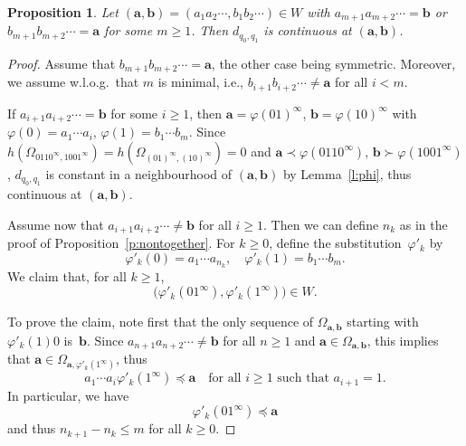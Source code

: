 \documentclass{amsart}
\newtheorem{proposition}[theorem]{Proposition}
\theoremstyle{definition}
\numberwithin{equation}{section}
\newcommand{\ba}{\mathbf{a}}
\newcommand{\bb}{\mathbf{b}}
\begin{document}
\begin{proposition} \label{p:together}
Let $(\ba,\bb) = (a_1a_2\cdots, b_1b_2\cdots) \in W$ with $a_{m+1} a_{m+2} \cdots = \bb$ or $b_{m+1} b_{m+2} \cdots = \ba$ for some $m \ge 1$.
Then $d_{q_0,q_1}$ is continuous at $(\ba,\bb)$. 
\end{proposition}

\begin{proof}
Assume that $b_{m+1} b_{m+2} \cdots = \ba$, the other case being symmetric.
Moreover, we assume w.l.o.g.\ that $m$ is minimal, i.e., $b_{i+1} b_{i+2} \cdots \ne \ba$ for all $i < m$.

If $a_{i+1}a_{i+2}\cdots = \bb$ for some $i \ge 1$, then $\ba = \varphi(01)^\infty$, $\bb = \varphi(10)^\infty$ with $\varphi(0) = a_1\cdots a_i$, $\varphi(1) = b_1\cdots b_m$.
Since $h(\Omega_{0110^\infty,1001^\infty}) = h(\Omega_{(01)^\infty,(10)^\infty}) = 0$ and $\ba \prec \varphi(0110^\infty)$, $\bb \succ \varphi(1001^\infty)$, $d_{q_0,q_1}$ is constant in a neighbourhood of $(\ba,\bb)$ by Lemma~\ref{l:phi}, thus continuous at $(\ba,\bb)$. 

Assume now that $a_{i+1}a_{i+2}\cdots \ne \bb$ for all $i \ge 1$.
Then we can define $n_k$ as in the proof of Proposition~\ref{p:nontogether}.
For $k \ge 0$, define the substitution~$\varphi'_k$ by
\[
\varphi'_k(0) = a_1 \cdots a_{n_k}, \quad \varphi'_k(1) = b_1 \cdots b_m.
\]
We claim that, for all $k \ge 1$,
\begin{equation} \label{e:phi'}
\big(\varphi'_k(01^\infty), \varphi'_k(1^\infty)\big) \in W.
\end{equation}

To prove the claim, note first that the only sequence of $\Omega_{\ba,\bb}$ starting with $\varphi'_k(1)0$ is~$\bb$.
Since $a_{n+1}a_{n+2}\cdots \ne \bb$ for all $n \ge 1$ and $\ba \in \Omega_{\ba,\bb}$, this implies that $\ba \in \Omega_{\ba,\varphi'_k(1^\infty)}$, thus 
\begin{equation} \label{e:ai}
a_1 \cdots a_i \varphi'_k(1^\infty) \preceq \ba \quad \mbox{for all $i \ge 1$ such that $a_{i+1} = 1$.}
\end{equation}
In particular, we have
\[
\varphi'_k(01^\infty) \preceq \ba
\]
and thus $n_{k+1}{-}n_k \le m$ for all $k \ge 0$.


\end{proof}
\end{document}
